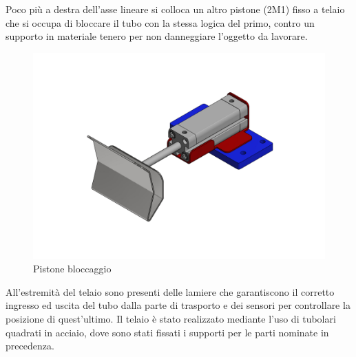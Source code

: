 \documentclass{report}
\begin{document}
Poco più a destra dell’asse lineare si colloca un altro pistone (2M1) fisso a telaio che si occupa di bloccare il tubo con la stessa logica del primo, contro un supporto in materiale tenero per non danneggiare l’oggetto da lavorare.
\begin{figure}[H]
  \centering
  \includegraphics[width=\textwidth]{src/img/pinza.pdf}
  \caption{Pistone bloccaggio}
  \label{fig:pinzaggio}
\end{figure}
All’estremità del telaio sono presenti delle lamiere che garantiscono il corretto ingresso ed uscita del tubo dalla parte di trasporto e dei sensori per controllare la posizione di quest’ultimo. Il telaio è stato realizzato mediante l’uso di tubolari quadrati in acciaio, dove sono stati fissati i supporti per le parti nominate in precedenza.
\end{document}

